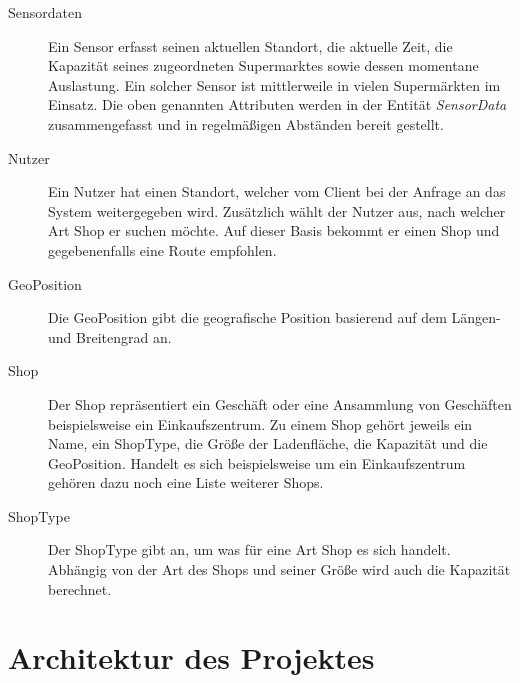 \documentclass[runningheads]{llncs}
\begin{document}
\begin{description}
	\item[Sensordaten] Ein Sensor erfasst seinen aktuellen Standort, die aktuelle Zeit, die Kapazität seines zugeordneten Supermarktes sowie dessen momentane Auslastung. Ein solcher Sensor ist mittlerweile in vielen Supermärkten im Einsatz. Die oben genannten Attributen werden in der Entität \textit{SensorData} zusammengefasst und in regelmäßigen Abständen bereit gestellt.
	\item[Nutzer] Ein Nutzer hat einen Standort, welcher vom Client bei der Anfrage an das System weitergegeben wird. Zusätzlich wählt der Nutzer aus, nach welcher Art Shop er suchen möchte. Auf dieser Basis bekommt er einen Shop und gegebenenfalls eine Route empfohlen.
	\item[GeoPosition] Die GeoPosition gibt die geografische Position basierend auf dem Längen- und Breitengrad an.
	\item[Shop] Der Shop repräsentiert ein Geschäft oder eine Ansammlung von Geschäften beispielsweise ein Einkaufszentrum. Zu einem Shop gehört jeweils ein Name, ein ShopType, die Größe der Ladenfläche, die Kapazität und die GeoPosition. Handelt es sich beispielsweise um ein Einkaufszentrum gehören dazu noch eine Liste weiterer Shops.
	\item[ShopType] Der ShopType gibt an, um was für eine Art Shop es sich handelt.
Abhängig von der Art des Shops und seiner Größe wird auch die Kapazität berechnet.
	
\end{description}


\section{Architektur des Projektes}
\end{document}
